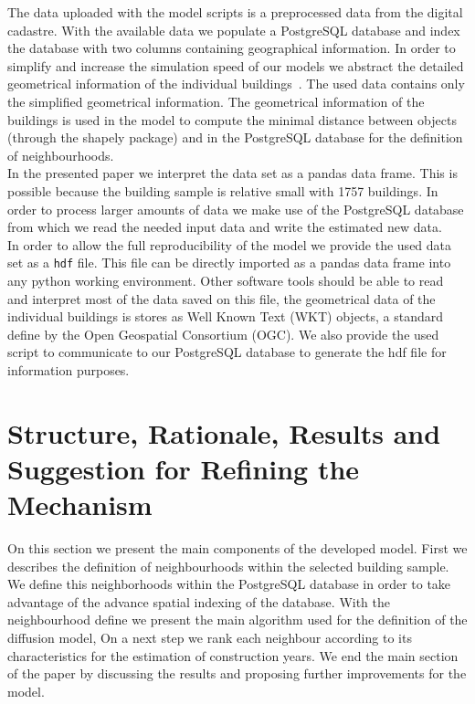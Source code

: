 The data uploaded with the model scripts is a preprocessed data from the
digital cadastre. With the available data we populate a PostgreSQL database and
index the database with two columns containing geographical information. In
order to simplify and increase the simulation speed of our models we abstract
the detailed geometrical information of the individual
buildings~\cite{MunozH.2015.MEQ}. The used data contains only the simplified
geometrical information. The geometrical information of the buildings is used
in the model to compute the minimal distance between objects (through the
shapely package) and in the PostgreSQL database for the definition of
neighbourhoods.\\ 

In the presented paper we interpret the data set as a pandas data frame. This
is possible because the building sample is relative small with 1757 buildings.
In order to process larger amounts of data we make use of the PostgreSQL
database from which we read the needed input data and write the estimated new
data.\\

In order to allow the full reproducibility of the model we provide the used
data set as a \verb|hdf| file. This file can be directly imported as a pandas
data frame into any python working environment. Other software tools should be
able to read and interpret most of the data saved on this file, the
geometrical data of the individual buildings is stores as Well Known Text (WKT)
objects, a standard define by the Open Geospatial Consortium (OGC).
We also provide the used script to communicate to our PostgreSQL database to
generate the hdf file for information purposes.\\

\section{Structure, Rationale, Results and Suggestion for Refining the
Mechanism}

On this section we present the main components of the developed model. First we
describes the definition of neighbourhoods within the selected building sample.
We define this neighborhoods within the PostgreSQL database in order to take
advantage of the advance spatial indexing of the database. With the
neighbourhood define we present the main algorithm used for the definition of
the diffusion model, On a next step we rank each neighbour according to its
characteristics for the estimation of construction years. We end the main
section of the paper by discussing the results and proposing further
improvements for the model.\\ 

